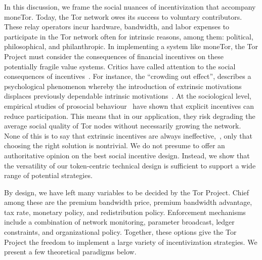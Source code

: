 In this discussion, we frame the social nuances of incentivization that accompany moneTor.
Today, the Tor network owes its success to voluntary contributors.
These relay operators incur hardware, bandwidth, and labor expenses to participate in the Tor network often for intrinsic reasons, among them: political, philosophical, and philanthropic.
In implementing a system like moneTor, the Tor Project must consider the consequences of financial incentives on these potentially fragile value systems.
Critics have called attention to the social consequences of incentives~\cite{jansenblogpost}.
For instance, the ``crowding out effect'', describes a psychological phenomenon whereby the introduction of extrinsic motivations displaces previously dependable intrinsic motivations~\cite{10.1257/jep.25.4.191}.
At the sociological level, empirical studies of prosocial behaviour~\cite{10.1257/aer.96.5.1652} have shown that explicit incentives can reduce participation.
This means that in our application, they risk degrading the average social quality of Tor nodes without necessarily growing the network.
None of this is to say that extrinsic incentives are always ineffective,~\cite{10.1257/aer.96.5.1652}, only that choosing the right solution is nontrivial.
We do not presume to offer an authoritative opinion on the best social incentive design.
Instead, we show that the versatility of our token-centric technical design is sufficient to support a wide range of potential strategies.

By design, we have left many variables to be decided by the Tor Project.
Chief among these are the premium bandwidth price, premium bandwidth advantage, tax rate, monetary policy, and redistribution policy.
Enforcement mechanisms include a combination of network monitoring, parameter broadcast, ledger constraints, and organizational policy.
Together, these options give the Tor Project the freedom to implement a large variety of incentivization strategies.
We present a few theoretical paradigms below.


